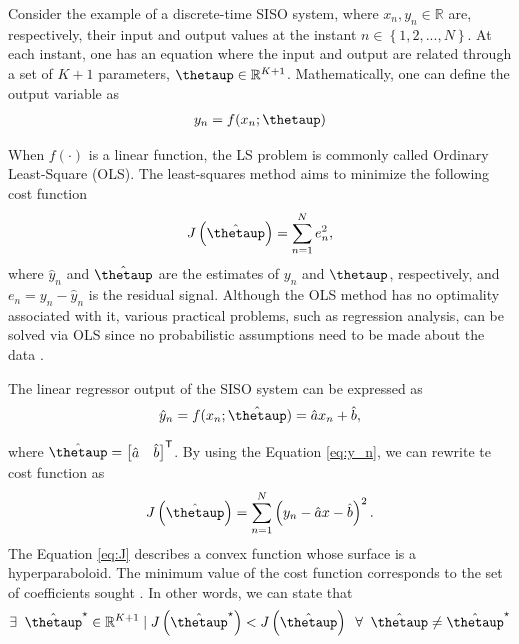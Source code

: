 \documentclass[english]{sobraep}
\newcommand{\trans}{\mathsf{T}}
\begin{document}
Consider the example of a discrete-time SISO system, where $x_n, y_n \in \mathbb{R}$ are, respectively, their input and output values at the instant $n \in \left\{1,2,...,N\right\}$. At each instant, one has an equation where the input and output are related through a set of \(K+1\) parameters, $\boldsymbol{\thetaup} \in \mathbb{R}^{K+1}$. Mathematically, one can define the output variable as
\begin{align}
    y_n = f(x_n;\boldsymbol{\thetaup})
\end{align}

When $f(\cdot)$ is a linear function, the LS problem is commonly called Ordinary Least-Square (OLS). The least-squares method aims to minimize the following cost function
\begin{align}
    J\left( \hat{\boldsymbol{\thetaup}} \right) = \sum_{n=1}^{N} e_n^2,
\end{align}
where \(\hat{y}_n\) and \(\hat{\boldsymbol{\thetaup}}\) are the estimates of \(y_n\) and \(\boldsymbol{\thetaup}\), respectively, and \(e_n = y_n - \hat{y}_n\) is the residual signal. Although the OLS method has no optimality associated with it, various practical problems, such as regression analysis, can be solved via OLS since no probabilistic assumptions need to be made about the data \cite{kay1993fundamentals}.

The linear regressor output of the SISO system can be expressed as
\begin{align}
    \label{eq:y_n}
    \hat{y}_n = f(x_n;\hat{\boldsymbol{\thetaup}}) = \hat{a}x_n + \hat{b},
\end{align}

where \(\hat{\boldsymbol{\thetaup}} = \begin{bmatrix} \hat{a} & \hat{b} \end{bmatrix}^\trans\). By using the Equation \eqref{eq:y_n}, we can rewrite te cost function as
\begin{align}
    \label{eq:J}
    J\left( \hat{\boldsymbol{\thetaup}} \right) = \sum_{n=1}^{N} \left( y_n - \hat{a}x - \hat{b} \right)^2.
\end{align}
The Equation \eqref{eq:J} describes a convex function whose surface is a hyperparaboloid. The minimum value of the cost function corresponds to the set of coefficients sought \cite{diniz1997adaptive}. In other words, we can state that
\begin{align}
    \exists \;\; \hat{\boldsymbol{\thetaup}}^{\star} \in \mathbb{R}^{K+1} \mid J\left(\hat{\boldsymbol{\thetaup}}^{\star}\right) < J\left(\hat{\boldsymbol{\thetaup}}\right) \;\; \forall \;\; \hat{\boldsymbol{\thetaup}} \neq \hat{\boldsymbol{\thetaup}}^{\star}
\end{align}
\end{document}
